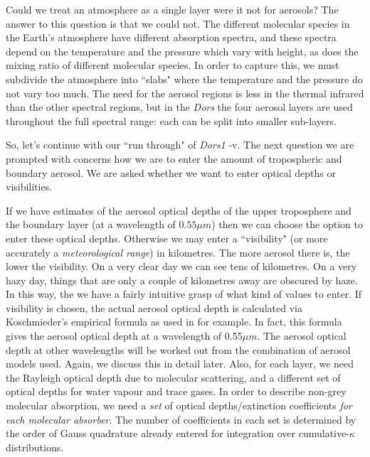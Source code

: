 \documentclass[12pt]{article}
\begin{document}
Could  we treat an atmosphere as a single layer were it not for aerosols? The answer to 
this question is that we could not.
The different molecular species in the Earth's atmosphere have different absorption spectra, and these spectra
depend on the temperature and the pressure which vary with height, as does the mixing ratio
of different molecular species.
In order to capture this, we must subdivide the atmosphere into ``slabs" where the temperature and
the pressure do not vary too much. The need for the aerosol regions is less in the thermal infrared
than the other spectral regions, but in the {\it Dors}  the four aerosol
layers are used throughout the full spectral range: each can be split into smaller sub-layers. 

So, let's  continue with  our ``run through" of {\it Dors1} -v.
 The next question we are prompted with  concerns how we are to enter the amount of tropospheric
and boundary aerosol. We are asked whether we want to enter optical depths or visibilities.

If we have estimates of the aerosol optical depths of the upper
troposphere and the boundary layer (at a wavelength of $0.55\mu m$) then we can choose the option to enter these optical depths.
Otherwise we may enter a ``visibility" (or more accurately a {\it meteorological range}) in kilometres.
The more aerosol there is, the lower the visibility. On a very clear day we can see tens of kilometres.
 On a very hazy day, things that are only a couple of kilometres away are obscured by haze. In
this way, the we have a fairly intuitive grasp of what kind of values to enter. If
 visibility
is chosen, the actual aerosol optical depth  is calculated via Koschmieder's empirical formula \cite{Koschmeider:Mybib} 
 as used in \cite{Longtin_etal:Mybib} for example.
In fact, this formula gives the aerosol optical depth at a wavelength of 0.55$\mu m$. The aerosol optical
depth at other wavelengths will be worked out from the combination of aerosol models used.
Again, we discuss this in detail later. Also, for each layer, we need the Rayleigh optical depth due to molecular scattering,
and a different set of optical depths for water vapour and trace gases. In order to describe non-grey molecular absorption,  we 
need a {\it set} of optical depths/extinction coefficients {\it for each molecular absorber}. The number of
coefficients in each set is determined by the order of Gauss quadrature already entered for integration over
 cumulative-$\kappa$ distributions.
 
\end{document}
